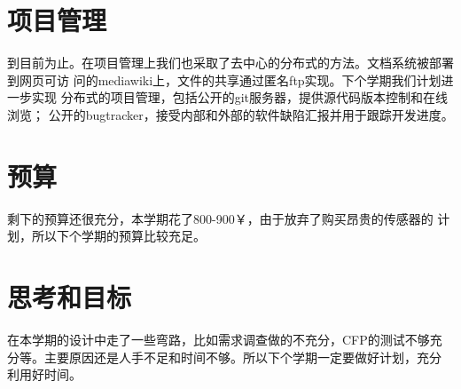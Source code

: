 \section{项目管理}

到目前为止。在项目管理上我们也采取了去中心的分布式的方法。文档系统被部署到网页可访
问的mediawiki上，文件的共享通过匿名ftp实现。下个学期我们计划进一步实现
分布式的项目管理，包括公开的git服务器，提供源代码版本控制和在线浏览；
公开的bugtracker，接受内部和外部的软件缺陷汇报并用于跟踪开发进度。

\section{预算}

剩下的预算还很充分，本学期花了800-900￥，由于放弃了购买昂贵的传感器的
计划，所以下个学期的预算比较充足。

\section{思考和目标}

在本学期的设计中走了一些弯路，比如需求调查做的不充分，CFP的测试不够充
分等。主要原因还是人手不足和时间不够。所以下个学期一定要做好计划，充分
利用好时间。

